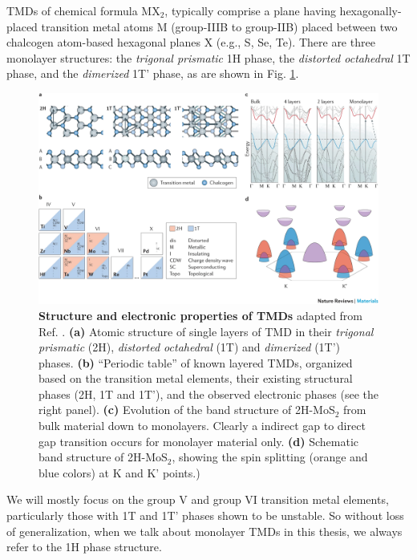 TMDs of chemical formula MX$_2$, typically comprise a plane having hexagonally-placed transition metal atoms M (group-IIIB to group-IIB) placed between two chalcogen atom-based hexagonal planes X (e.g., S, Se, Te). There are three monolayer structures: the \emph{trigonal prismatic} 1H phase, the \emph{distorted octahedral} 1T phase, and the \emph{dimerized} 1T' phase, as are shown in Fig. \ref{fig:TMD_electonic_properties}.
\begin{figure}[!htp]
    \centering
    \includegraphics[width=1.0\textwidth]{figures/TMD.png}
    \caption{\textbf{Structure and electronic properties of TMDs} adapted from Ref. \cite{manzeli20172d}. \textbf{(a)} Atomic structure of single layers of TMD in their \emph{trigonal prismatic} (2H), \emph{distorted octahedral} (1T) and \emph{dimerized} (1T') phases. \textbf{(b)} ``Periodic table'' of known layered TMDs, organized based on the transition metal elements, their existing structural phases (2H, 1T and 1T'), and the observed electronic phases (see the right panel). \textbf{(c)} Evolution of the band structure of 2H-MoS$_2$ from bulk material down to monolayers. Clearly a indirect gap to direct gap transition occurs for monolayer material only. \textbf{(d)} Schematic band structure of 2H-MoS$_2$, showing the spin splitting (orange and blue colors) at K and K' points.)}
    \label{fig:TMD_electonic_properties}
\end{figure}
We will mostly focus on the group V and group VI transition metal elements, particularly those with 1T and 1T' phases shown to be unstable. So without loss of generalization, when we talk about monolayer TMDs in this thesis, we always refer to the 1H phase structure.
